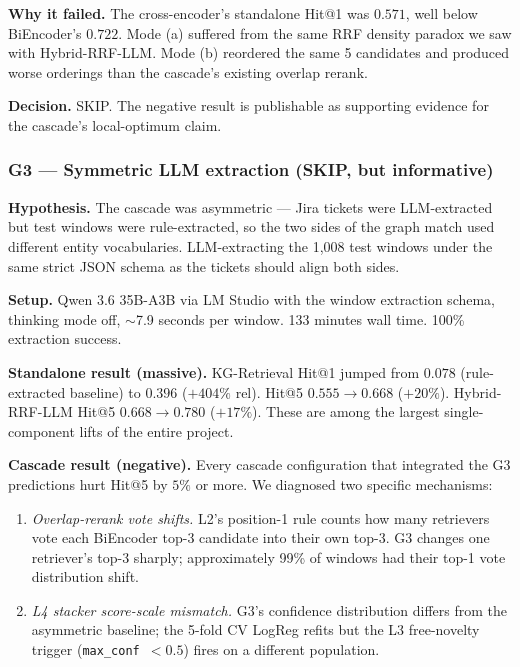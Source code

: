 \textbf{Why it failed.} The cross-encoder's standalone Hit@1 was $0.571$, well below BiEncoder's $0.722$. Mode (a) suffered from the same RRF density paradox we saw with Hybrid-RRF-LLM. Mode (b) reordered the same 5 candidates and produced worse orderings than the cascade's existing overlap rerank.

\textbf{Decision.} SKIP. The negative result is publishable as supporting evidence for the cascade's local-optimum claim.

\subsubsection{G3 --- Symmetric LLM extraction (SKIP, but informative)}

\textbf{Hypothesis.} The cascade was asymmetric --- Jira tickets were LLM-extracted but test windows were rule-extracted, so the two sides of the graph match used different entity vocabularies. LLM-extracting the 1{,}008 test windows under the same strict JSON schema as the tickets should align both sides.

\textbf{Setup.} Qwen 3.6 35B-A3B via LM Studio with the window extraction schema, thinking mode off, $\sim$7.9 seconds per window. 133 minutes wall time. 100\% extraction success.

\textbf{Standalone result (massive).} KG-Retrieval Hit@1 jumped from $0.078$ (rule-extracted baseline) to $0.396$ ($+404\%$ rel). Hit@5 $0.555 \to 0.668$ ($+20\%$). Hybrid-RRF-LLM Hit@5 $0.668 \to 0.780$ ($+17\%$). These are among the largest single-component lifts of the entire project.

\textbf{Cascade result (negative).} Every cascade configuration that integrated the G3 predictions hurt Hit@5 by $5\%$ or more. We diagnosed two specific mechanisms:

\begin{enumerate}
\item \emph{Overlap-rerank vote shifts.} L2's position-1 rule counts how many retrievers vote each BiEncoder top-3 candidate into their own top-3. G3 changes one retriever's top-3 sharply; approximately 99\% of windows had their top-1 vote distribution shift.
\item \emph{L4 stacker score-scale mismatch.} G3's confidence distribution differs from the asymmetric baseline; the 5-fold CV LogReg refits but the L3 free-novelty trigger (\texttt{max\_conf $< 0.5$}) fires on a different population.
\end{enumerate}

